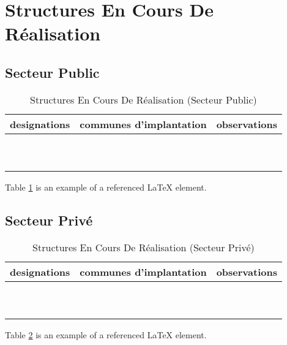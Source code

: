 \newpage
\section{Structures En Cours De Réalisation}
\subsection{Secteur Public}


\begin{table}[h!]
\begin{center}
\begin{tabular}{|p{5cm}|p{5cm}|p{5cm}|}
\hline
designations	&communes d’implantation	&observations\\
\hline
&&\\
&&\\
&&\\
&&\\
&&\\
&&\\
&&\\
&&\\
&&\\
&&\\

\hline
\end{tabular}
\end{center}
\caption{Structures En Cours De Réalisation (Secteur Public) }
\label{table:55}
\end{table}
Table \ref{table:55} is an example of a referenced \LaTeX{} element.


\subsection{Secteur Privé}
\begin{table}[h!]
\begin{center}
\begin{tabular}{|p{5cm}|p{5cm}|p{5cm}|}
\hline
designations	&communes d’implantation	&observations\\
\hline
&&\\
&&\\
&&\\
&&\\
&&\\
&&\\
&&\\
&&\\
&&\\
&&\\

\hline
\end{tabular}
\end{center}
\caption{Structures En Cours De Réalisation (Secteur Privé) }
\label{table:555}
\end{table}
Table \ref{table:555} is an example of a referenced \LaTeX{} element.

